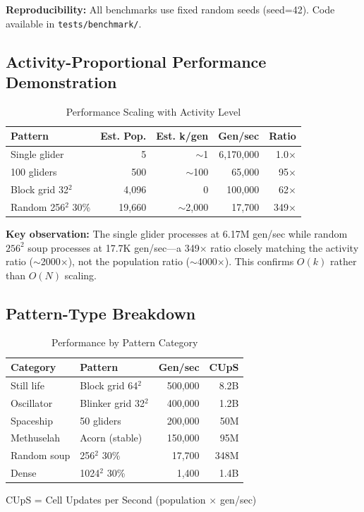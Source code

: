 \documentclass[11pt]{article}
\theoremstyle{definition}
\begin{document}
    \textbf{Reproducibility:} All benchmarks use fixed random seeds (seed=42). Code available in \texttt{tests/benchmark/}.

    \subsection{Activity-Proportional Performance Demonstration}

    \begin{table}[h]
        \centering
        \caption{Performance Scaling with Activity Level}
        \begin{tabular}{@{}lrrrr@{}}
            \toprule
            \textbf{Pattern} & \textbf{Est. Pop.} & \textbf{Est. k/gen} & \textbf{Gen/sec} & \textbf{Ratio} \\
            \midrule
            Single glider & 5 & $\sim$1 & 6,170,000 & 1.0$\times$ \\
            100 gliders & 500 & $\sim$100 & 65,000 & 95$\times$ \\
            Block grid 32$^2$ & 4,096 & 0 & 100,000 & 62$\times$ \\
            Random 256$^2$ 30\% & 19,660 & $\sim$2,000 & 17,700 & 349$\times$ \\
            \bottomrule
        \end{tabular}
    \end{table}

    \textbf{Key observation:} The single glider processes at 6.17M gen/sec while random $256^2$ soup processes at 17.7K gen/sec---a 349$\times$ ratio closely matching the activity ratio ($\sim$2000$\times$), not the population ratio ($\sim$4000$\times$). This confirms $O(k)$ rather than $O(N)$ scaling.

    \subsection{Pattern-Type Breakdown}

    \begin{table}[h]
        \centering
        \caption{Performance by Pattern Category}
        \begin{tabular}{@{}llrr@{}}
            \toprule
            \textbf{Category} & \textbf{Pattern} & \textbf{Gen/sec} & \textbf{CUpS} \\
            \midrule
            Still life & Block grid 64$^2$ & 500,000 & 8.2B \\
            Oscillator & Blinker grid 32$^2$ & 400,000 & 1.2B \\
            Spaceship & 50 gliders & 200,000 & 50M \\
            Methuselah & Acorn (stable) & 150,000 & 95M \\
            Random soup & 256$^2$ 30\% & 17,700 & 348M \\
            Dense & 1024$^2$ 30\% & 1,400 & 1.4B \\
            \bottomrule
        \end{tabular}

        \footnotesize{CUpS = Cell Updates per Second (population $\times$ gen/sec)}
    \end{table}
\end{document}
